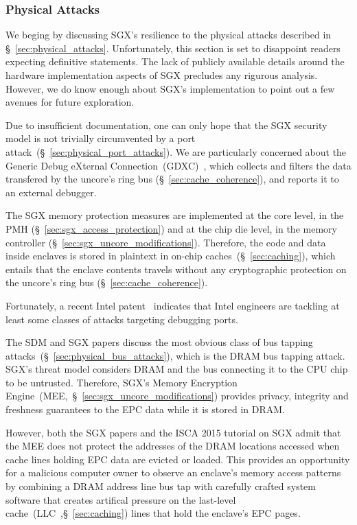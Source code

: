 \subsubsection{Physical Attacks}
\label{sec:sgx_vs_physical_attacks}

We beging by discussing SGX's resilience to the physical attacks described in
\S~\ref{sec:physical_attacks}. Unfortunately, this section is set to disappoint
readers expecting definitive statements. The lack of publicly available details
around the hardware implementation aspects of SGX precludes any rigurous
analysis. However, we do know enough about SGX's implementation to point out a
few avenues for future exploration.

Due to insufficient documentation, one can only hope that the SGX security
model is not trivially circumvented by a port
attack~(\S~\ref{sec:physical_port_attacks}). We are particularly concerned
about the Generic Debug eXternal
Connection~(GDXC)~\cite{yuffe2011sandybridge, intel2011gdxc}, which collects
and filters the data transfered by the uncore's ring bus
(\S~\ref{sec:cache_coherence}), and reports it to an external debugger.

The SGX memory protection measures are implemented at the core level, in the
PMH (\S~\ref{sec:sgx_access_protection}) and at the chip die level, in the
memory controller (\S~\ref{sec:sgx_uncore_modifications}). Therefore, the code
and data inside enclaves is stored in plaintext in on-chip
caches~(\S~\ref{sec:caching}), which entails that the enclave contents travels
without any cryptographic protection on the uncore's ring bus
(\S~\ref{sec:cache_coherence}).

Fortunately, a recent Intel patent~\cite{shanbhogue2015gdxcsgx} indicates that
Intel engineers are tackling at least some classes of attacks targeting
debugging ports.

The SDM and SGX papers discuss the most obvious class of bus tapping
attacks~(\S~\ref{sec:physical_bus_attacks}), which is the DRAM bus tapping
attack. SGX's threat model considers DRAM and the bus connecting it to the CPU
chip to be untrusted. Therefore, SGX's Memory Encryption
Engine~(MEE,~\S~\ref{sec:sgx_uncore_modifications}) provides privacy, integrity
and freshness guarantees to the EPC data while it is stored in DRAM.

However, both the SGX papers and the ISCA 2015 tutorial on SGX admit that the
MEE does not protect the addresses of the DRAM locations accessed when cache
lines holding EPC data are evicted or loaded. This provides an opportunity for
a malicious computer owner to observe an enclave's memory access patterns by
combining a DRAM address line bus tap with carefully crafted system software
that creates artifical pressure on the last-level
cache~(LLC~,\S~\ref{sec:caching}) lines that hold the enclave's EPC pages.

